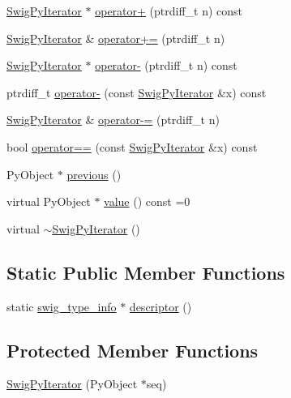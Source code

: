 \begin{DoxyCompactItemize}
\item 
\hyperlink{structswig_1_1_swig_py_iterator}{Swig\+Py\+Iterator} $\ast$ \hyperlink{structswig_1_1_swig_py_iterator_a35a2eef6ddbe2342fb0c9881084d3ee4}{operator+} (ptrdiff\+\_\+t n) const
\item 
\hyperlink{structswig_1_1_swig_py_iterator}{Swig\+Py\+Iterator} \& \hyperlink{structswig_1_1_swig_py_iterator_a81afed8a7dfb6c44a8d31069e44aabc2}{operator+=} (ptrdiff\+\_\+t n)
\item 
\hyperlink{structswig_1_1_swig_py_iterator}{Swig\+Py\+Iterator} $\ast$ \hyperlink{structswig_1_1_swig_py_iterator_af41383899796677955b31807fd7ccfd7}{operator-\/} (ptrdiff\+\_\+t n) const
\item 
ptrdiff\+\_\+t \hyperlink{structswig_1_1_swig_py_iterator_a2d8edb0c0896c7766cfebe7ac2140496}{operator-\/} (const \hyperlink{structswig_1_1_swig_py_iterator}{Swig\+Py\+Iterator} \&x) const
\item 
\hyperlink{structswig_1_1_swig_py_iterator}{Swig\+Py\+Iterator} \& \hyperlink{structswig_1_1_swig_py_iterator_a1de70234523e1e2512586c06ad697f21}{operator-\/=} (ptrdiff\+\_\+t n)
\item 
bool \hyperlink{structswig_1_1_swig_py_iterator_a38be5d8177173d8858482f21b12748a1}{operator==} (const \hyperlink{structswig_1_1_swig_py_iterator}{Swig\+Py\+Iterator} \&x) const
\item 
Py\+Object $\ast$ \hyperlink{structswig_1_1_swig_py_iterator_ae2a3dea10c5f69c67ef7fbb4e279ad7a}{previous} ()
\item 
virtual Py\+Object $\ast$ \hyperlink{structswig_1_1_swig_py_iterator_a7ba184c8ea37f53dbd75b6678a23f20c}{value} () const =0
\item 
virtual \hyperlink{structswig_1_1_swig_py_iterator_ab47c4f340032dc58caad34198d8cdfaf}{$\sim$\+Swig\+Py\+Iterator} ()
\end{DoxyCompactItemize}
\subsection*{Static Public Member Functions}
\begin{DoxyCompactItemize}
\item 
static \hyperlink{structswig__type__info}{swig\+\_\+type\+\_\+info} $\ast$ \hyperlink{structswig_1_1_swig_py_iterator_ac77f47f6ed06f7113252940588a3f39e}{descriptor} ()
\end{DoxyCompactItemize}
\subsection*{Protected Member Functions}
\begin{DoxyCompactItemize}
\item 
\hyperlink{structswig_1_1_swig_py_iterator_a88c0a14160ab680c8251f61e01b38d77}{Swig\+Py\+Iterator} (Py\+Object $\ast$seq)
\end{DoxyCompactItemize}



